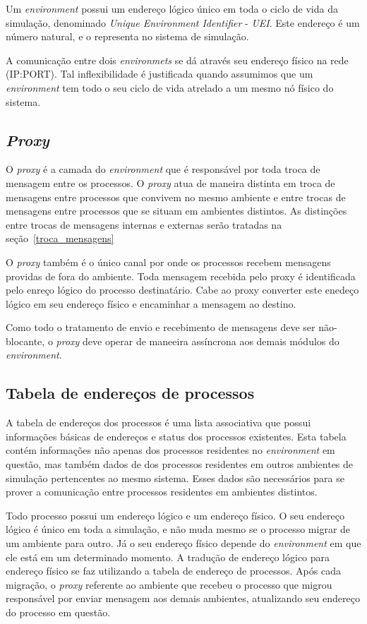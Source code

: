 Um \textit{environment} possui um endereço lógico único em toda o ciclo de vida da simulação, denominado \textit{Unique Environment Identifier} - \textit{UEI}. Este endereço é um número natural, e o representa no sistema de simulação.

A comunicação entre dois \textit{environmets} se dá através seu endereço físico na rede (IP:PORT). Tal inflexibilidade é justificada quando assumimos que um \textit{environment} tem todo o seu ciclo de vida atrelado a um mesmo nó físico do sistema.

\subsection{\textit{Proxy}}

O \textit{proxy} é a camada do \textit{environment} que é responsável por toda troca de mensagem entre os processos. O \textit{proxy} atua de maneira distinta em troca de mensagens entre processos que convivem no mesmo ambiente e entre trocas de mensagens entre processos que se situam em ambientes distintos. As distinções entre trocas de mensagens internas e externas serão tratadas na seção~\ref{troca_mensagens}

O \textit{proxy} também é o único canal por onde os processos recebem mensagens providas de fora do ambiente. Toda mensagem recebida pelo proxy é identificada pelo enreço lógico do processo destinatário. Cabe ao proxy converter este enedeço lógico em seu endereço físico e encaminhar a mensagem ao destino.

Como todo o tratamento de envio e recebimento de mensagens deve ser não-blocante, o \textit{proxy} deve operar de maneeira assíncrona aos demais módulos do \textit{environment}.

\subsection{Tabela de endereços de processos}

A tabela de endereços dos processos é uma lista associativa que possui informações básicas de endereços e status dos processos existentes. Esta tabela contém informações não apenas dos processos residentes no \textit{environment} em questão, mas também dados de dos processos residentes em outros ambientes de simulação pertencentes ao mesmo sistema. Esses dados são necessários para se prover a comunicação entre processos residentes em ambientes distintos.

Todo processo possui um endereço lógico e um endereço físico. O seu endereço lógico é único em toda a simulação, e não muda mesmo se o processo migrar de um ambiente para outro. Já o seu endereço físico depende do \textit{environment} em que ele está em um determinado momento. A tradução de endereço lógico para endereço físico se faz utilizando a tabela de endereço de processos. Após cada migração, o \textit{proxy} referente ao ambiente que recebeu o processo que migrou responsável por enviar mensagem aos demais ambientes, atualizando seu endereço do processo em questão.

